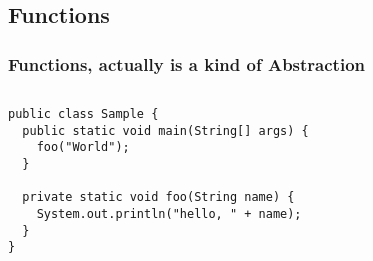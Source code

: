 \documentclass[en, 11pt, xcolor=dvipsnames]{beamer}
\begin{document}
\subsection{Functions}
\begin{frame}[fragile]
	\frametitle{Functions, actually is a kind of Abstraction}


	\begin{columns}[c]
		\begin{column}{0.98\textwidth}

			\begin{lstlisting}[style=Java]
public class Sample {
  public static void main(String[] args) {
    foo("World");
  }

  private static void foo(String name) {
    System.out.println("hello, " + name);
  }
}
\end{lstlisting}

		\end{column}
	\end{columns}

\end{frame}
\end{document}
